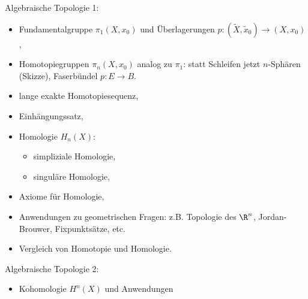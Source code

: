 
Algebraische Topologie 1:
\begin{itemize}
    \item
        Fundamentalgruppe $\pi_1(X, x_0)$ und Überlagerungen $p: (\tilde X, \tilde x_0) \to (X, x_0)$,
    \item
        Homotopiegruppen $\pi_n(X, x_0)$ analog zu $\pi_1$: statt Schleifen jetzt $n$-Sphären (Skizze),
        Faserbündel $p: E \to B$.
    \item
        lange exakte Homotopiesequenz,
    \item
        Einhängungssatz,
    \item
        Homologie $H_n(X)$:
        \begin{itemize}
            \item
                simpliziale Homologie,
            \item
                singuläre Homologie,
        \end{itemize}
    \item
        Axiome für Homologie,
    \item
        Anwendungen zu geometrischen Fragen: z.B. Topologie des $\R^n$, Jordan-Brouwer, Fixpunktsätze, etc.
    \item
        Vergleich von Homotopie und Homologie.
\end{itemize}

Algebraische Topologie 2:
\begin{itemize}
    \item
        Kohomologie $H^n(X)$ und Anwendungen
\end{itemize}
